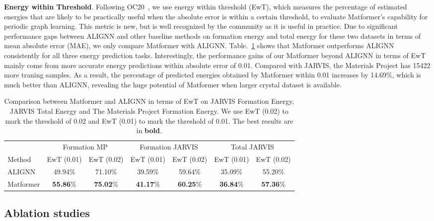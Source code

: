 \documentclass{article}
\begin{document}
\textbf{Energy within Threshold}. Following OC20~\cite{ocp_dataset}, we use energy within threshold (EwT), which measures the percentage of estimated energies that are likely to be practically useful when the absolute error is within a certain threshold, to evaluate Matformer's capability for periodic graph learning. This metric is new, but is well recognized by the community as it is useful in practice.
Due to significant performance gaps between ALIGNN and other baseline methods on formation energy and total energy for these two datasets in terms of mean absolute error (MAE), we only compare Matformer with ALIGNN. Table.~\ref{ewt-table} shows that Matformer outperforms ALIGNN consistently for all three energy prediction tasks. Interestingly, the performance gains of our Matformer beyond ALIGNN in terms of EwT mainly come from more accurate energy predictions within absolute error of 0.01. Compared with JARVIS, the Materials Project has 15422 more traning samples. As a result, the percentage of predicted energies obtained by Matformer within 0.01 increases by 14.69\%, which is much better than ALIGNN, revealing the huge potential of Matformer when larger crystal dataset is available. 

\begin{table}
  \caption{Comparison between Matformer and ALIGNN in terms of EwT on JARVIS Formation Energy, JARVIS Total Energy and The Materials Project Formation Energy. We use EwT (0.02) to mark the threshold of 0.02 and EwT (0.01) to mark the threshold of 0.01. The best results are in \textbf{bold}.}
  \label{ewt-table}
  \centering
  \begin{tabular}{lcccccc}
    \toprule
& \multicolumn{2}{c}{Formation MP} & \multicolumn{2}{c}{Formation JARVIS} & \multicolumn{2}{c}{Total JARVIS} \\
    \cmidrule(r){2-7}
    Method & EwT (0.01) &  EwT (0.02) & EwT (0.01)  &  EwT (0.02)  &EwT (0.01) &  EwT (0.02)     \\
    \midrule
    ALIGNN & 49.94\% & 71.10\% & 39.59\% & 59.64\% & 35.09\% & 55.20\% \\
    Matformer & \textbf{55.86}\% & \textbf{75.02}\% & \textbf{41.17}\% & \textbf{60.25}\% & \textbf{36.84}\% & \textbf{57.36}\%  \\
    \bottomrule
  \end{tabular}
  \vspace{-6mm}
\end{table}


\subsection{Ablation studies}
\label{sec:ablation}
\end{document}
